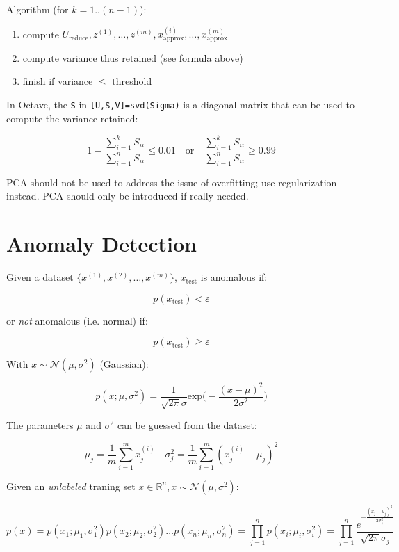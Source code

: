 \documentclass[a4paper,11pt]{scrartcl}
\begin{document}
Algorithm (for $k=1..(n-1)$):

\begin{enumerate}
    \item compute $U_{\text{reduce}}, z^{(1)}, \dots, z^{(m)}, x_{\text{approx}}^{(i)}, \dots, x_{\text{approx}}^{(m)}$
    \item compute variance thus retained (see formula above)
    \item finish if variance $\leq$ threshold
\end{enumerate}

In Octave, the \texttt{S} in \texttt{[U,S,V]=svd(Sigma)} is a diagonal matrix that can be used to compute the variance retained:

$$ 1 - \frac{\sum_{i=1}^k S_{ii}}{\sum_{i=1}^n S_{ii}} \leq 0.01 \quad \text{or} \quad \frac{\sum_{i=1}^k S_{ii}}{\sum_{i=1}^n S_{ii}} \geq 0.99 $$

PCA should not be used to address the issue of overfitting; use regularization instead. PCA should only be introduced if really needed.

\section{Anomaly Detection}

Given a dataset $\{ x^{(1)},x^{(2)},\dots,x^{(m)} \}$, $x_{\text{test}}$ is anomalous if:

$$ p(x_{\text{test}}) < \varepsilon $$

or \textit{not} anomalous (i.e. normal) if:

$$ p(x_{\text{test}}) \geq \varepsilon $$

With $x \sim \mathcal{N}(\mu,\sigma^2)$ (Gaussian):

$$ p(x;\mu,\sigma^2) = \frac{1}{\sqrt{2\pi}\sigma} \text{exp}\Bigg(- \frac{(x-\mu)^2}{2\sigma^2} \Bigg)$$

The parameters $\mu$ and $\sigma^2$ can be guessed from the dataset:

$$ \mu_j = \frac{1}{m} \sum_{i=1}^{m} x_j^{(i)} \quad \sigma^2_j = \frac{1}{m} \sum_{i=1}^{m} (x_j^{(i)} - \mu_j)^2 $$

Given an \textit{unlabeled} traning set $x \in \mathbb{R}^n, x \sim \mathcal{N}(\mu,\sigma^2)$:

$$ p(x) = p(x_1;\mu_1,\sigma_1^2) p(x_2;\mu_2,\sigma_2^2) \dots p(x_n;\mu_n,\sigma_n^2) = \prod_{j=1}^{n} p(x_i;\mu_i,\sigma_i^2) = \prod_{j=1}^{n} \frac{e^{- \frac{(x_j-\mu_j)^2}{2\sigma_j^2}}}{\sqrt{2\pi}\sigma_j} $$
\end{document}

